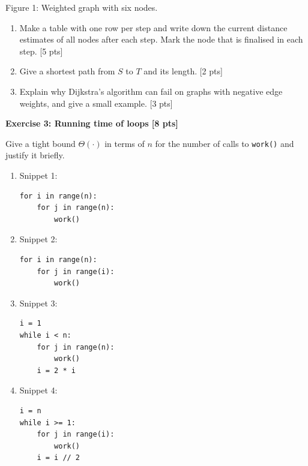 \documentclass[11pt,a4paper]{article}
\newcommand{\exercise}[3]{\bigskip\par\noindent\textbf{Exercise #1: #2 [#3 pts]}\par\nopagebreak\smallskip}
\begin{document}
\begin{center}

\small Figure 1: Weighted graph with six nodes.
\end{center}
\begin{enumerate}
  \item Make a table with one row per step and write down the current distance estimates of all nodes
        after each step. Mark the node that is finalised in each step. [5 pts]
  \item Give a shortest path from $S$ to $T$ and its length. [2 pts]
  \item Explain why Dijkstra's algorithm can fail on graphs with negative edge weights, and give a
        small example. [3 pts]
\end{enumerate}

\exercise{3}{Running time of loops}{8}
Give a tight bound $\Theta(\cdot)$ in terms of $n$ for the number of calls to \texttt{work()} and
justify it briefly.
\begin{enumerate}
  \item Snippet 1:
\begin{lstlisting}
for i in range(n):
    for j in range(n):
        work()
\end{lstlisting}
  \item Snippet 2:
\begin{lstlisting}
for i in range(n):
    for j in range(i):
        work()
\end{lstlisting}
  \item Snippet 3:
\begin{lstlisting}
i = 1
while i < n:
    for j in range(n):
        work()
    i = 2 * i
\end{lstlisting}
  \item Snippet 4:
\begin{lstlisting}
i = n
while i >= 1:
    for j in range(i):
        work()
    i = i // 2
\end{lstlisting}
\end{enumerate}
\end{document}
